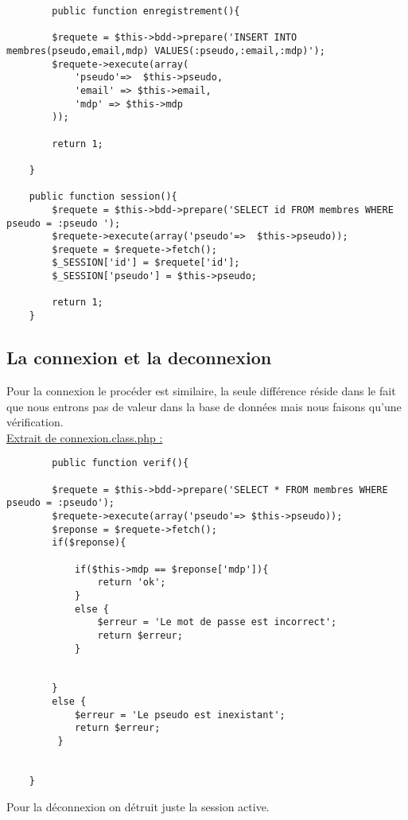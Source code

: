 \documentclass{article}
\begin{document}
    \begin{lstlisting}
        public function enregistrement(){
        
        $requete = $this->bdd->prepare('INSERT INTO membres(pseudo,email,mdp) VALUES(:pseudo,:email,:mdp)');
        $requete->execute(array(
            'pseudo'=>  $this->pseudo,
            'email' => $this->email,
            'mdp' => $this->mdp 
        ));
        
        return 1; 
       
    }
    
    public function session(){
        $requete = $this->bdd->prepare('SELECT id FROM membres WHERE pseudo = :pseudo ');
        $requete->execute(array('pseudo'=>  $this->pseudo));
        $requete = $requete->fetch();
        $_SESSION['id'] = $requete['id'];
        $_SESSION['pseudo'] = $this->pseudo;
        
        return 1;
    }
    \end{lstlisting}
    \newpage
    \subsection{La connexion et la deconnexion}
    Pour la connexion le procéder est similaire, la seule différence réside dans le fait que nous entrons pas de valeur dans la base de données mais nous faisons qu'une vérification. \\
    \underline{Extrait de connexion.class.php :}
    \begin{lstlisting}
        public function verif(){
        
        $requete = $this->bdd->prepare('SELECT * FROM membres WHERE pseudo = :pseudo');
        $requete->execute(array('pseudo'=> $this->pseudo));
        $reponse = $requete->fetch();
        if($reponse){
            
            if($this->mdp == $reponse['mdp']){
                return 'ok';
            }
            else {
                $erreur = 'Le mot de passe est incorrect';
                return $erreur;
            }
            
            
        }
        else {
            $erreur = 'Le pseudo est inexistant';
            return $erreur;
         }
        
        
    }
    \end{lstlisting} 
    Pour la déconnexion on détruit juste la session active. 
\end{document}
